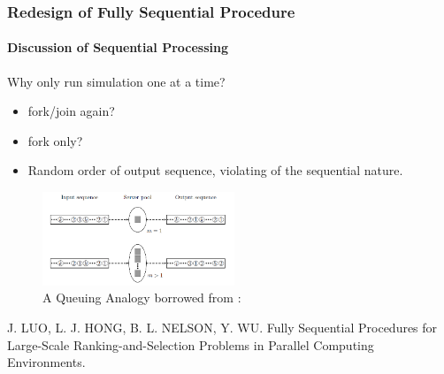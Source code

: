 \documentclass{beamer}
\begin{document}
\begin{frame}
\frametitle{Redesign of Fully Sequential Procedure}
\framesubtitle{Discussion of Sequential Processing}
Why only run simulation one at a time?
\begin{itemize}
\item fork/join again?
\item fork only?
\item Random order of output sequence, violating of the sequential nature.
\end{itemize}
\begin{figure}[ht]
\centering
\includegraphics[height=28mm]{queueing.png}
\caption{A Queuing Analogy borrowed from \cite{ras-seq-parallel}:}
\end{figure}
\tiny
{
\begin{thebibliography}{10}
 J. LUO, L. J. HONG, B. L. NELSON, Y. WU. Fully Sequential Procedures for Large-Scale Ranking-and-Selection Problems in Parallel Computing Environments.
\end{thebibliography}
}
\end{frame}
\end{document}
